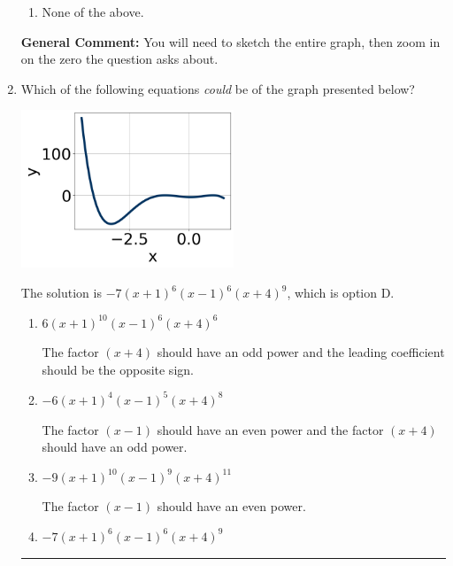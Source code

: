 \documentclass{extbook}[14pt]
\newcommand{\litem}[1]{\item #1

\rule{\textwidth}{0.4pt}}
\begin{document}
\begin{enumerate}
{\begin{enumerate}[label=\Alph*.]
\item None of the above.\end{enumerate}
\textbf{General Comment:} You will need to sketch the entire graph, then zoom in on the zero the question asks about.
}
\litem{
Which of the following equations \textit{could} be of the graph presented below?

\begin{center}
    \includegraphics[width=0.5\textwidth]{../Figures/polyGraphToFunctionCopyB.png}
\end{center}




The solution is \( -7(x + 1)^{6} (x - 1)^{6} (x + 4)^{9} \), which is option D.\begin{enumerate}[label=\Alph*.]
\item \( 6(x + 1)^{10} (x - 1)^{6} (x + 4)^{6} \)

The factor $(x + 4)$ should have an odd power and the leading coefficient should be the opposite sign.
\item \( -6(x + 1)^{4} (x - 1)^{5} (x + 4)^{8} \)

The factor $(x - 1)$ should have an even power and the factor $(x + 4)$ should have an odd power.
\item \( -9(x + 1)^{10} (x - 1)^{9} (x + 4)^{11} \)

The factor $(x - 1)$ should have an even power.
\item \( -7(x + 1)^{6} (x - 1)^{6} (x + 4)^{9} \)


\end{enumerate}}
\end{enumerate}
\end{document}
